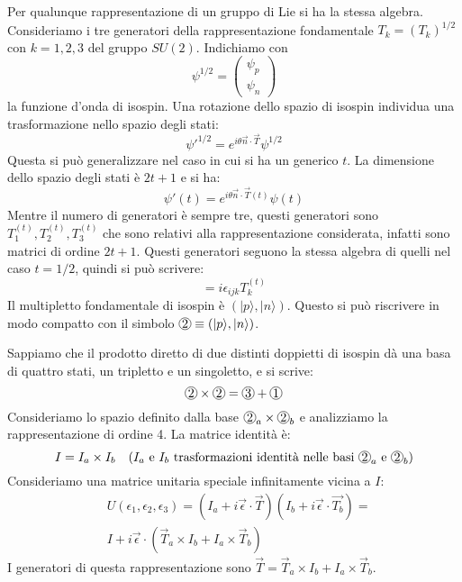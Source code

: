  Per qualunque rappresentazione di un gruppo di Lie si ha
la stessa algebra.
Consideriamo i tre generatori della rappresentazione fondamentale
$T_k=(T_k)^{1/2}$ con $k=1,2,3$ del gruppo $SU(2)$. Indichiamo con
\[
\psi^{1/2}=
\begin{pmatrix}
\psi_p\\
\psi_n
\end{pmatrix}
\]
la funzione d'onda di isospin. Una rotazione dello spazio di isospin individua 
una trasformazione nello spazio degli stati:
\begin{equation}
\psi'^{1/2}=e^{i\theta\vec{n}\cdot\vec{T}}\psi^{1/2}
\end{equation}
Questa si può generalizzare nel caso in cui si ha un generico $t$. La 
dimensione dello spazio degli stati è $2t+1$ e si ha:
\[
\psi'(t)=e^{i\theta\vec{n}\cdot\vec{T}(t)}\psi(t)
\]
Mentre il numero di generatori è sempre tre, questi generatori sono 
$T_1^{(t)},T_2^{(t)},T_3^{(t)}$ che
sono relativi alla rappresentazione considerata, infatti sono matrici di ordine 
$2t+1$.
Questi generatori seguono la stessa algebra di quelli nel caso $t=1/2$, quindi 
si può scrivere:
\begin{equation}
[T_i^{(t)},T_j^{(t)}]=i\epsilon_{ijk}T_k^{(t)}
\end{equation}
Il multipletto fondamentale di isospin è $(|p\rangle,|n\rangle)$. Questo si 
può
riscrivere in modo compatto con il simbolo $\Ci{2} \equiv 
(|p\rangle,|n\rangle)$.

Sappiamo che il prodotto diretto di due distinti doppietti di isospin dà una 
basa di quattro stati, un tripletto e
un singoletto, e si scrive:
\[
\Ci{2}\times\Ci{2}=\Ci{3}+\Ci{1}
\]
Consideriamo lo spazio definito dalla base $\Ci{2}_a\times\Ci{2}_b$ e 
analizziamo la rappresentazione di ordine
4. La matrice identità è:
\[
I=I_a\times I_b\quad(\text{$I_a$ e $I_b$ trasformazioni identità nelle basi 
$\Ci{2}_a$ e $\Ci{2}_b$})
\]
Consideriamo una matrice unitaria speciale infinitamente vicina a $I$:
\begin{equation}
\begin{split}
&U(\epsilon_1,\epsilon_2,\epsilon_3)=(I_a+i\vec{\epsilon}\cdot\vec{T})(I_b+i\vec
{\epsilon}\cdot\vec{T_b})=\\
&I+i\vec{\epsilon}\cdot(\vec{T}_a\times I_b+I_a\times\vec{T}_b)
\end{split}
\end{equation}
I generatori di questa rappresentazione sono $\vec{T}=\vec{T}_a\times 
I_b+I_a\times\vec{T}_b$.

